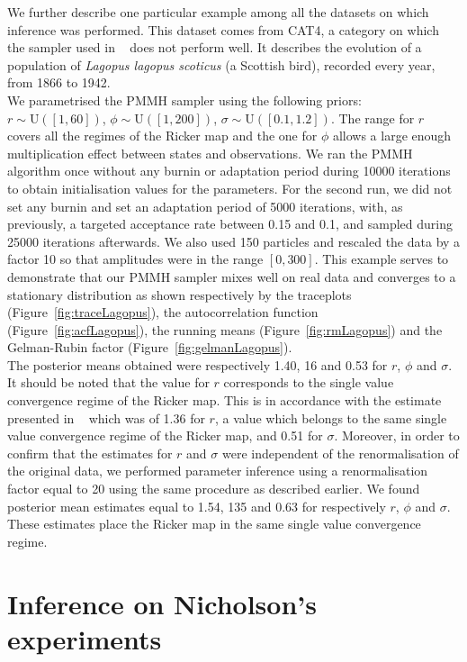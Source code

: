 \documentclass[12pt]{article}
\begin{document}
	We further describe one particular example among all the datasets on which inference was performed. This dataset comes from CAT4, a category on which the sampler used in ~\cite{gao2012bayesian} does not perform well. It describes the evolution of a population of \emph{Lagopus lagopus scoticus} (a Scottish bird), recorded every year, from 1866 to 1942. \\
	We parametrised the PMMH sampler using the following priors: $r \sim \mathrm{U}([1, 60])$, $\phi \sim \mathrm{U}([1, 200])$, $\sigma \sim \mathrm{U}([0.1, 1.2])$. The range for $r$ covers all the regimes of the Ricker map and the one for $\phi$ allows a large enough multiplication effect between states and observations. We ran the PMMH algorithm once without any burnin or adaptation period during 10000 iterations to obtain initialisation values for the parameters. For the second run, we did not set any burnin and set an adaptation period of 5000 iterations, with, as previously, a targeted acceptance rate between 0.15 and 0.1, and sampled during 25000 iterations afterwards. We also used 150 particles and rescaled the data by a factor 10 so that amplitudes were in the range $[0, 300]$. This example serves to demonstrate that our PMMH sampler mixes well on real data and converges to a stationary distribution as shown respectively by the traceplots (Figure~\ref{fig:traceLagopus}), the autocorrelation function (Figure~\ref{fig:acfLagopus}), the running means (Figure~\ref{fig:rmLagopus}) and the Gelman-Rubin factor (Figure~\ref{fig:gelmanLagopus}). \\
	The posterior means obtained were respectively 1.40, 16 and 0.53 for $r$, $\phi$ and $\sigma$. It should be noted that the value for $r$ corresponds to the single value convergence regime of the Ricker map. This is in accordance with the estimate presented in ~\cite{gao2012bayesian} which was of 1.36 for $r$, a value which belongs to the same single value convergence regime of the Ricker map, and 0.51 for $\sigma$. Moreover, in order to confirm that the estimates for $r$ and $\sigma$ were independent of the renormalisation of the original data, we performed parameter inference using a renormalisation factor equal to 20 using the same procedure as described earlier. We found posterior mean estimates equal to 1.54, 135 and 0.63 for respectively $r$, $\phi$ and $\sigma$. These estimates place the Ricker map in the same single value convergence regime.
	
	\section{Inference on Nicholson's experiments} \label{infNicholson}
\end{document}
